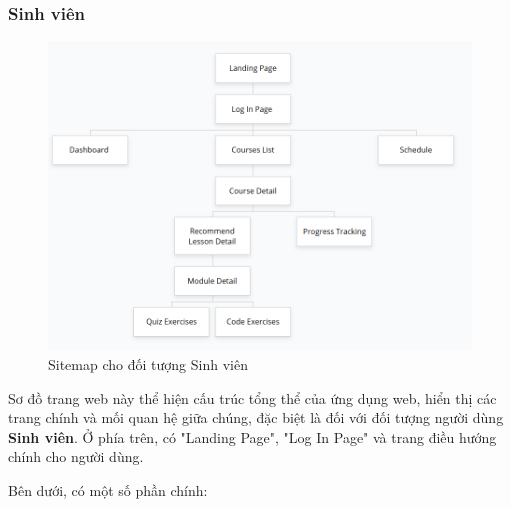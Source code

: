 \subsubsection{Sinh viên}
\begin{figure}[H]
    \centering
    \includegraphics[scale=0.8]{Images/sitemap/Student.png}
    \caption{Sitemap cho đối tượng Sinh viên}
    \label{fig:enter-label}
\end{figure}
\par Sơ đồ trang web này thể hiện cấu trúc tổng thể của ứng dụng web, hiển thị các trang chính và mối quan hệ giữa chúng, đặc biệt là đối với đối tượng người dùng \textbf{Sinh viên}. Ở phía trên, có "Landing Page", "Log In Page" và trang điều hướng chính cho người dùng.
\par Bên dưới, có một số phần chính:

